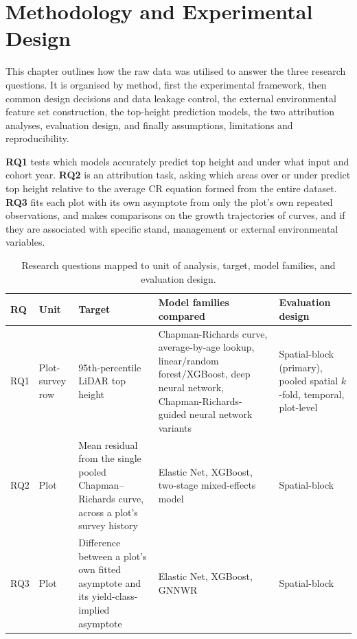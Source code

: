 

\chapter{Methodology and Experimental Design}
\label{ch:methodology}

This chapter outlines how the raw data was utilised to answer the three research questions. It is organised by method, first the experimental framework, then common design decisions and data leakage control, the external environmental feature set construction, the top-height prediction models, the two attribution analyses, evaluation design, and finally assumptions, limitations and reproducibility.



\textbf{RQ1} tests which models accurately predict top height and under what input and cohort year. \textbf{RQ2} is an attribution task, asking which areas over or under predict top height relative to the average CR equation formed from the entire dataset. \textbf{RQ3} fits each plot with its own asymptote from only the plot's own repeated observations, and makes comparisons on the growth trajectories of curves, and if they are associated with specific stand, management or external environmental variables.

\begin{table}[!htbp]
\scriptsize
\renewcommand{\arraystretch}{1.2}
\begin{tabular}{p{0.8cm}p{1.4cm}p{3.3cm}p{4.2cm}p{2.9cm}}
\toprule
RQ & Unit & Target & Model families compared & Evaluation design \\
\midrule
RQ1 & Plot-survey row & 95th-percentile LiDAR top height & Chapman-Richards curve, average-by-age
lookup, linear/random forest/XGBoost, deep neural network, Chapman-Richards-guided neural network
variants & Spatial-block (primary), pooled spatial $k$-fold, temporal, plot-level \\
RQ2 & Plot & Mean residual from the single pooled Chapman--Richards curve, across a plot's survey
history & Elastic Net, XGBoost, two-stage mixed-effects model & Spatial-block \\
RQ3 & Plot & Difference between a plot's own fitted asymptote and its yield-class-implied
asymptote & Elastic Net, XGBoost, GNNWR & Spatial-block \\
\bottomrule
\end{tabular}
\caption{Research questions mapped to unit of analysis, target, model families, and evaluation
design.}
\label{tab:rq-framework}
\end{table}

